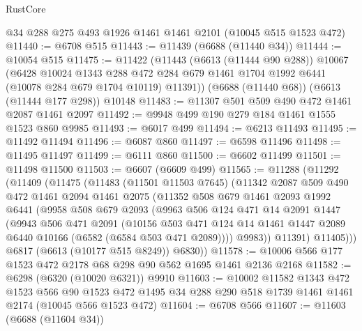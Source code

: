 \begin{lexlean}{RustCore}
\begin{coremodule}
    @34
    @288
    @275
    @493
    @1926
    @1461
    @1461
    @2101
    (@10045 @515 @1523 @472)
@11440 := @6708 @515
@11443 := @11439 (@6688 (@11440 @34))
@11444 := @10054 @515
@11475 := @11422
    (@11443
      (@6613 (@11444 @90 @288))
      @10067
      (@6428
        @10024
        @1343
        @288
        @472
        @284
        @679
        @1461
        @1704
        @1992
        @6441
        (@10078 @284 @679 @1704 @10119)
        @11391))
    (@6688 (@11440 @68))
    (@6613 (@11444 @177 @298))
    @10148
@11483 := @11307 @501 @509 @490 @472 @1461 @2087 @1461 @2097
@11492 := @9948 @499 @190 @279 @184 @1461 @1555 @1523 @860 @9985
@11493 := @6017 @499
@11494 := @6213 @11493
@11495 := @11492 @11494
@11496 := @6087 @860
@11497 := @6598 @11496
@11498 := @11495 @11497
@11499 := @6111 @860
@11500 := @6602 @11499
@11501 := @11498 @11500
@11503 := @6607 (@6609 @499)
@11565 := @11288
    (@11292
      (@11409
        (@11475
          (@11483
            (@11501 @11503 @7645)
            (@11342
              @2087
              @509
              @490
              @472
              @1461
              @2094
              @1461
              @2075
              (@11352
                @508
                @679
                @1461
                @2093
                @1992
                @6441
                (@9958
                  @508
                  @679
                  @2093
                  (@9963
                    @506
                    @124
                    @471
                    @14
                    @2091
                    @1447
                    (@9943
                      @506
                      @471
                      @2091
                      (@10156
                        @503
                        @471
                        @124
                        @14
                        @1461
                        @1447
                        @2089
                        @6440
                        @10166
                        (@6582 (@6584 @503 @471 @2089))))
                    @9983))
                @11391)
              @11405)))
        @6817
        (@6613 (@10177 @515 @8249))
        @6830))
@11578 := @10006 @566 @177 @1523 @472 @2178 @68 @298 @90 @562 @1695 @1461 @2136 @2168
@11582 := @6298 (@6320 (@10020 @6321)) @9910
@11603 := @10002
    @11582
    @1343
    @472
    @1523
    @566
    @90
    @1523
    @472
    @1495
    @34
    @288
    @290
    @518
    @1739
    @1461
    @1461
    @2174
    (@10045 @566 @1523 @472)
@11604 := @6708 @566
@11607 := @11603 (@6688 (@11604 @34))

\end{coremodule}
\end{lexlean}
